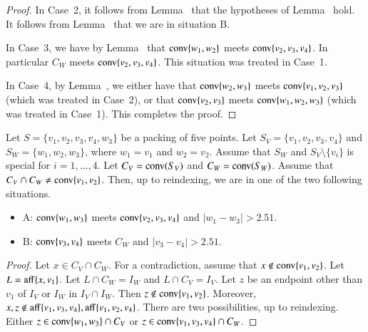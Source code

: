 \begin{tarskidata}
\begin{tarski}
\begin{proof}
In Case~2, it follows from Lemma~ that
the hypotheses of Lemma~ hold.  It follows
from Lemma~ that we are in situation B.

In Case~3, we have by Lemma~ that ${\operatorname{conv}}\{w_1,w_2\}$
meets ${\operatorname{conv}}\{v_2,v_3,v_4\}$. In particular $C_W$ meets
${\operatorname{conv}}\{v_2,v_3,v_4\}$.  This situation was treated in Case~1.

In Case~4, by Lemma~, we either have that ${\operatorname{conv}}\{w_2,w_3\}$
meets ${\operatorname{conv}}\{v_1,v_2,v_3\}$ (which was treated in Case~2),
or that ${\operatorname{conv}}\{v_2,v_3\}$ meets ${\operatorname{conv}}\{w_1,w_2,w_3\}$
(which was treated in Case~1).  This completes the proof.
\end{proof}
\end{tarski}





\begin{tarski}

\begin{lemma}
Let $S=\{v_1,v_2,v_3,v_4,w_3\}$ be a packing of five points.
Let $S_V =\{v_1,v_2,v_3,v_4\}$ and $S_W=\{w_1,w_2,w_3\}$, where
$w_1=v_1$ and $w_2=v_2$.  
Assume that $S_W$ and $S_V\setminus\{v_i\}$ is special for $i=1,\ldots,4$.
Let $C_V={\operatorname{conv}}(S_V)$ and $C_W={\operatorname{conv}}(S_W)$.
Assume that $C_V\cap C_W\ne {\operatorname{conv}}\{v_1,v_2\}$.
Then, up to reindexing, we are in one of the two following situations.
\begin{itemize}
\item A: ${\operatorname{conv}}\{w_1,w_3\}$ meets ${\operatorname{conv}}\{v_2,v_3,v_4\}$
and $|w_1-w_3|>2.51$.
\item B:  ${\operatorname{conv}}\{v_3,v_4\}$ meets $C_W$ and $|v_3-v_4|>2.51$.
\end{itemize}
\end{lemma}

\begin{proof}
Let $x\in C_V\cap C_W$.  For a contradiction, assume that
$x\not\in{\operatorname{conv}}\{v_1,v_2\}$.  Let $L={\operatorname{aff}}\{x,v_1\}$.
Let $L\cap C_W = I_W$ and $L\cap C_V = I_V$.  Let $z$ be an endpoint
other than $v_1$
of $I_V$ or $I_W$ in $I_V\cap I_W$.  Then $z\not\in{\operatorname{conv}}\{v_1,v_2\}$. 
Moreover, $x,z\not\in{\operatorname{aff}}\{v_1,v_3,v_4\},{\operatorname{aff}}\{v_1,v_2,v_4\}$. 
There are two possibilities, up to reindexing.
Either $z\in {\operatorname{conv}}\{w_1,w_3\}\cap C_V$ or 
$z\in{\operatorname{conv}}\{v_1,v_3,v_4\}\cap C_W$.


\end{proof}
\end{tarski}
\end{tarskidata}

